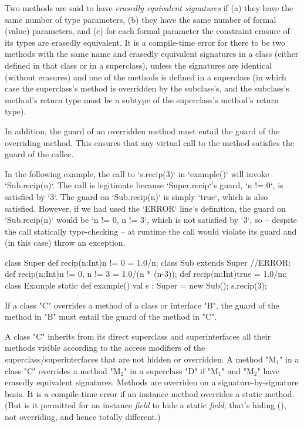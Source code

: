  Two methods are said to have {\em erasedly equivalent signatures} if (a) they have the
 same number of type parameters, 
(b) they have the same number of formal (value) parameters, and (c)
for each formal parameter the constraint erasure of its types are erasedly equivalent.
It is a 
compile-time error for there to be two methods with the same name and
erasedly equivalent signatures in a class (either defined in that class or in a
superclass), unless the signatures are identical (without erasures) and one of the methods is
defined in a superclass (in which case the superclass's method is overridden
by the subclass's, and the subclass's method's return type must be a subtype of
the superclass's method's return type).  

 



In addition, the guard of an overridden method
must entail
the guard of the overriding method.   This
ensures that any virtual call to the method
satisfies the guard of the callee.

\begin{ex}
In the following example, the call to \xcd`s.recip(3)` in \xcd`example()`
will invoke \xcd`Sub.recip(n)`.  The call is legitimate because
\xcd`Super.recip`'s guard, \xcd`n != 0`, is satisfied by \xcd`3`.  
The guard on \xcd`Sub.recip(n)` is simply
\xcd`true`, which is also satisfied.  However, if we had used the \xcd`ERROR`
line's definition, the guard on \xcd`Sub.recip(n)` would be \xcd`n != 0, n != 3`, which
is not satisfied by \xcd`3`, so -- despite the call statically type-checking
-- at runtime the call would violate its guard and (in this case) throw an exception.
\begin{xten}
class Super {
  def recip(n:Int){n != 0} = 1.0/n;
}
class Sub extends Super{
  //ERROR: def recip(n:Int){n != 0, n != 3} = 1.0/(n * (n-3));
  def recip(m:Int){true} = 1.0/m;
}
class Example{
  static def example() {
     val s : Super = new Sub();
     s.recip(3);
  }
}
\end{xten}
%

\end{ex}


  If a class \xcd"C" overrides a method of a class or interface
  \xcd"B", the guard of the method in \xcd"B" must entail
  the guard of the method in \xcd"C".


A class \xcd"C" inherits from its direct superclass and superinterfaces all
their methods visible according to the access modifiers
of the superclass/superinterfaces that are not hidden or overridden. A method \xcdmath"M$_1$" in a class
\xcd"C" overrides
a method \xcdmath"M$_2$" in a superclass \xcd"D" if
\xcdmath"M$_1$" and \xcdmath"M$_2$" have erasedly equivalent signatures.
Methods are overriden on a signature-by-signature basis.  It is a compile-time
error if an instance method overrides a static method.  (But is it permitted
for an instance {\em field} to hide a static {\em field}; that's hiding
(), not 
overriding, and hence totally different.)

